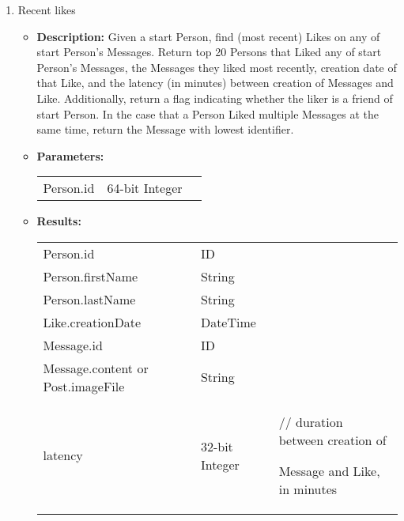 {\begin{enumerate}
    \item Recent likes
        \begin{itemize}
            \item \textbf{Description:}
                Given a start Person, find (most recent) Likes on any of start
                Person's Messages.  Return top 20 Persons that Liked any of
                start Person's Messages, the Messages they liked most
                recently, creation date of that Like, and the latency (in minutes)
                between creation of Messages and Like.  Additionally, return a
                flag indicating whether the liker is a friend of start Person.  In
                the case that a Person Liked multiple Messages at the same
                time, return the Message with lowest identifier.
            \item \textbf{Parameters:} \\
                \begin{tabular}{lll}
                    Person.id 	 						& 64-bit Integer & \parbox[t]{20cm}{\par \strut} \\
                \end{tabular}		
            \item \textbf{Results:} \\
                \begin{tabular}{lll}
                    Person.id 	 								& ID & \parbox[t]{20cm}{\par \strut} \\
                    Person.firstName 							& String & \parbox[t]{20cm}{\par \strut} \\
                    Person.lastName 	 						& String & \parbox[t]{20cm}{\par \strut} \\
                    Like.creationDate 	 						& DateTime & \parbox[t]{20cm}{\par \strut} \\
                    Message.id 	 						& ID & \parbox[t]{20cm}{\par \strut} \\
                    Message.content or Post.imageFile	& String & \parbox[t]{20cm}{\par \strut} \\
                    latency 	 								& 32-bit Integer &
                    \parbox[t]{20cm}{// duration between creation of\par Message and Like, in minutes\strut} \\

\end{tabular}
\end{itemize}
\end{enumerate}}
